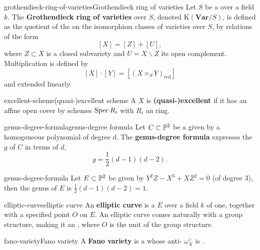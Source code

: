 \begin{topic}{grothendieck-ring-of-varieties}{Grothendieck ring of varieties}
    Let $S$ be a  over a field $k$. The \textbf{Grothendieck ring of varieties} over $S$, denoted $\text{K}(\textbf{Var}/S)$, is defined as the quotient of the  on the isomorphism classes of varieties over $S$, by relations of the form
    \[ [X] = [Z] + [U] , \]
    where $Z \subset X$ is a closed subvariety and $U = X \backslash Z$ its open complement. Multiplication is defined by
    \[ [X] \cdot [Y] = [(X \times_S Y)_\text{red}] \]
    and extended linearly.
\end{topic}

\begin{topic}{excellent-scheme}{(quasi-)excellent scheme}
    A  $X$ is \textbf{(quasi-)excellent} if it has an affine open cover by schemes $\operatorname{Spec} R_i$ with $R_i$ an  ring.
\end{topic}

\begin{topic}{genus-degree-formula}{genus-degree formula}
    Let $C \subset \mathbb{P}^2$ be a   given by a homogeneous polynomial of degree $d$. The \textbf{genus-degree formula} expresses the  $g$ of $C$ in terms of $d$,
    \[ g = \frac{1}{2}(d - 1)(d - 2) . \]
\end{topic}

\begin{example}{genus-degree-formula}
    Let $E \subset \mathbb{P}^2$ be given by $Y^2Z - X^3 + XZ^2 = 0$ (of degree $3$), then the genus of $E$ is $\frac{1}{2}(d - 1)(d - 2) = 1$.
\end{example}

\begin{topic}{elliptic-curve}{elliptic curve}
    An \textbf{elliptic curve} is a    $E$ over a field $k$ of  one, together with a specified point $O$ on $E$. An elliptic curve comes naturally with a group structure, making it an , where $O$ is the unit of the group structure.
\end{topic}

\begin{topic}{fano-variety}{Fano variety}
    A \textbf{Fano variety} is a  whose anti- $\omega_X^\vee$ is .
\end{topic}

